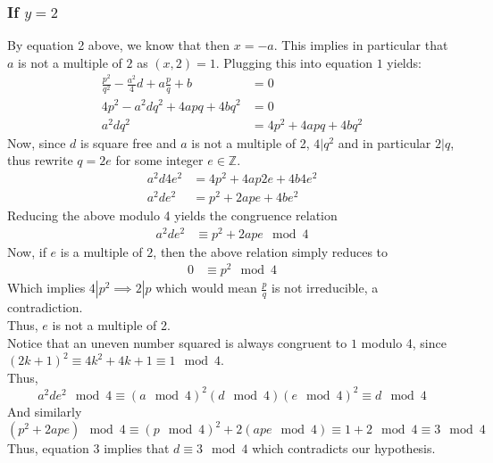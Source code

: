\documentclass[11pt, a4paper]{article}
\begin{document}
\subsubsection*{ If $y=2$ }
By equation 2 above, we know that then $ x=-a$.
This implies in particular that $a$ is not a multiple of $2$ as $( x,2) =1$. 
Plugging this into equation $1$ yields:
\begin{align*}
	\frac{p^{2}}{q ^{2}} - \frac{a^{2}}{4} d + a \frac{p}{q}+b &=0\\
	4p^{2} - a^{2}d q^{2} + 4 a pq + 4bq^{2} &=0\\
	a^{2}dq^{2} &= 4p^{2} + 4 a pq + 4 bq^{2}
\end{align*}
Now, since $d$ is square free and $a$ is not a multiple of 2, $4 | q^{2}$ and in particular $2 | q$, thus rewrite $q = 2 e $ for some integer $e \in \mathbb{Z}$.\\
\begin{align*}
	a^{2} d 4 e^{2} &= 4 p^{2} + 4 a p 2 e + 4b 4 e^{2}\\
	a^{2} d e^{2} &= p^{2} + 2 ape + 4be^{2}
\end{align*}
Reducing the above modulo 4 yields the congruence relation
\begin{align}
	a^{2} d e^{2} &\equiv p^{2} + 2 a p e \mod 4
\end{align}
Now, if $e$ is a multiple of $2$, then the above relation simply reduces to
\begin{align*}
	0 &\equiv p^{2}\mod 4
\end{align*}
Which implies $4 | p^{2} \implies 2 | p$ which would mean $\frac{p}{q}$ is not irreducible, a contradiction.\\
Thus, $e$ is not a multiple of 2.\\
Notice that an uneven number squared is always congruent to $1$ modulo 4, since $( 2k+1)^{2} \equiv 4k^{2} + 4k + 1 \equiv 1 \mod 4$.\\
Thus,
\[
	a^{2} d e^{2} \mod 4 \equiv ( a\mod 4)^{2} ( d\mod 4 ) ( e\mod 4)^{2} \equiv d\mod 4
\]
And similarly
\[ 
	( p^{2} + 2ape) \mod 4 \equiv ( p\mod 4)^{2} + 2 ( ape \mod 4) \equiv 1 + 2 \mod 4 \equiv 3 \mod 4
\]
Thus, equation 3 implies that $d \equiv 3\mod 4 $ which contradicts our hypothesis.
\end{document}
